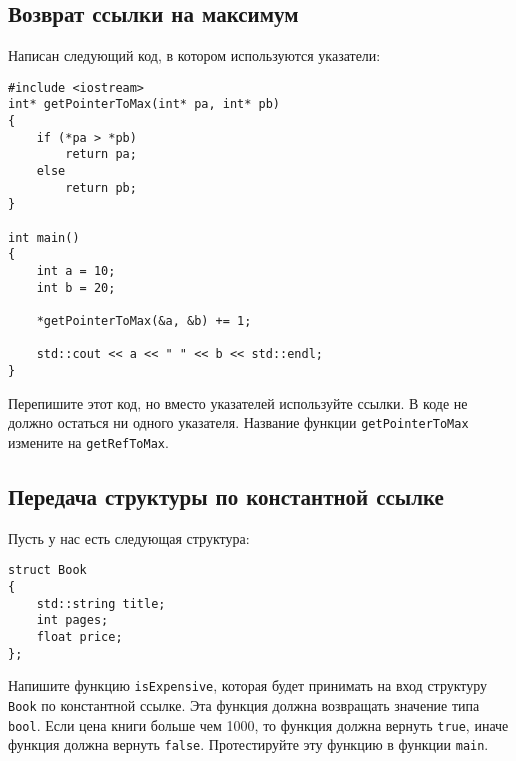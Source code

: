 \documentclass{article}
\begin{document}
\subsection{Возврат ссылки на максимум}
Написан следующий код, в котором используются указатели:
\begin{lstlisting}
#include <iostream>
int* getPointerToMax(int* pa, int* pb)
{
	if (*pa > *pb)
		return pa;
	else
		return pb;
}

int main()
{
	int a = 10;
	int b = 20;
	
	*getPointerToMax(&a, &b) += 1;
	
	std::cout << a << " " << b << std::endl;
}
\end{lstlisting}
Перепишите этот код, но вместо указателей используйте ссылки. В коде не должно остаться ни одного указателя. Название функции \texttt{getPointerToMax} измените на \texttt{getRefToMax}.

\iffalse
\subsection{Передача структуры по ссылке}
Пусть у нас есть следующая структура:
\begin{lstlisting}
struct Book
{
    std::string title;
    int pages;
    float price;
};
\end{lstlisting}
Напишите функцию \texttt{addPrice}, которая будет принимать на вход структуру \texttt{Book} по ссылке и некоторое число \texttt{x} типа \texttt{float}. Эта функция должна увеличивать цену переданной книги на \texttt{x}. Протестируйте эту функцию в функции \texttt{main}.
\fi

\subsection{Передача структуры по константной ссылке}
Пусть у нас есть следующая структура:
\begin{lstlisting}
struct Book
{
    std::string title;
    int pages;
    float price;
};
\end{lstlisting}
Напишите функцию \texttt{isExpensive}, которая будет принимать на вход структуру \texttt{Book} по константной ссылке. Эта функция должна возвращать значение типа \texttt{bool}. Если цена книги больше чем 1000, то функция должна вернуть \texttt{true}, иначе функция должна вернуть \texttt{false}. Протестируйте эту функцию в функции \texttt{main}.
\end{document}
